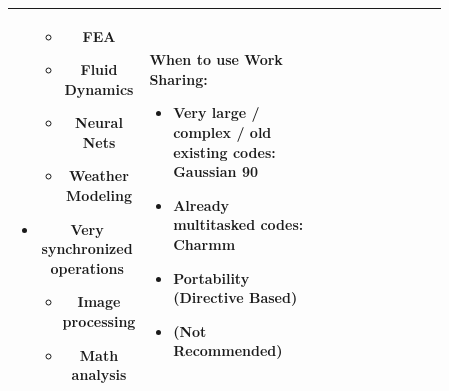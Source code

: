 \documentclass[12pt, a4paper]{book}
\begin{document}
\begin{longtable}{|c|p{0.43\linewidth}|p{0.43\linewidth}|}
\begin{itemize}
                                                         \begin{itemize}
                  \item FEA
                  \item Fluid Dynamics
                  \item Neural Nets
                  \item Weather Modeling
              \end{itemize}
                                                   \item Very synchronized operations
                                                         \begin{itemize}
                  \item Image processing
                  \item Math analysis
              \end{itemize}
                                               \end{itemize}                                                             & When to use Work Sharing: \begin{itemize}
                                                                                                                                                         \item Very large / complex / old existing codes: Gaussian 90
                                                                                                                                                         \item Already multitasked codes: Charmm
                                                                                                                                                         \item Portability (Directive Based)
                                                                                                                                                         \item (Not Recommended)
                                                                                                                                                     \end{itemize}                   \\
    \hline
\end{longtable}
\end{document}
